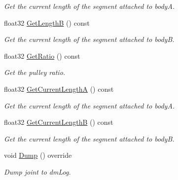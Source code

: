 \begin{DoxyCompactItemize}
\begin{DoxyCompactList}\small\item\em Get the current length of the segment attached to bodyA. \end{DoxyCompactList}\item 
\mbox{\label{classb2PulleyJoint_a8558201dc81ba177f040ec7e12d78c8d}} 
float32 \hyperlink{classb2PulleyJoint_a8558201dc81ba177f040ec7e12d78c8d}{Get\+LengthB} () const
\begin{DoxyCompactList}\small\item\em Get the current length of the segment attached to bodyB. \end{DoxyCompactList}\item 
\mbox{\label{classb2PulleyJoint_a130e85a48bfe54588d15766b94e3b2b2}} 
float32 \hyperlink{classb2PulleyJoint_a130e85a48bfe54588d15766b94e3b2b2}{Get\+Ratio} () const
\begin{DoxyCompactList}\small\item\em Get the pulley ratio. \end{DoxyCompactList}\item 
\mbox{\label{classb2PulleyJoint_a4b4f29d81b7d2ffdda5af2f588f49ab6}} 
float32 \hyperlink{classb2PulleyJoint_a4b4f29d81b7d2ffdda5af2f588f49ab6}{Get\+Current\+LengthA} () const
\begin{DoxyCompactList}\small\item\em Get the current length of the segment attached to bodyA. \end{DoxyCompactList}\item 
\mbox{\label{classb2PulleyJoint_aa2d15dc26b2df0a446ccda652058085d}} 
float32 \hyperlink{classb2PulleyJoint_aa2d15dc26b2df0a446ccda652058085d}{Get\+Current\+LengthB} () const
\begin{DoxyCompactList}\small\item\em Get the current length of the segment attached to bodyB. \end{DoxyCompactList}\item 
\mbox{\label{classb2PulleyJoint_a51b3fa745fc43f806cee1328099b4623}} 
void \hyperlink{classb2PulleyJoint_a51b3fa745fc43f806cee1328099b4623}{Dump} () override
\begin{DoxyCompactList}\small\item\em Dump joint to dm\+Log. \end{DoxyCompactList}\item 

\end{DoxyCompactItemize}
